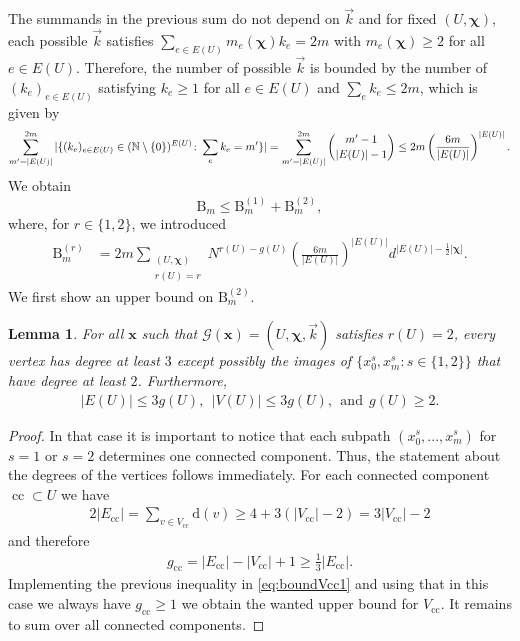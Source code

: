 \documentclass[10pt,a4paper]{amsart}
\DeclareMathOperator{\cc}{cc}
\newcommand{\abs}[1]{\left| #1 \right|}
\newcommand{\patx}{\boldsymbol{x}}
\newcommand{\patchi}{\boldsymbol{\chi}}
\newtheorem{lemma}{Lemma}[section]
\numberwithin{equation}{section}
\newcommand{\nc}{\normalcolor}
\begin{document}
	The summands in the previous sum do not depend on $\vec{k}$ and for fixed $(U,\patchi)$, each possible $\vec{k}$ satisfies $\sum_{e\in E(U)} m_{e}(\patchi) k_{e} = 2m$ with $m_e(\patchi) \ge 2$ for all $e \in E(U)$. Therefore, the number of possible $\vec{k}$ is bounded by the number of $(k_{e})_{e \in E(U)}$ satisfying $k_e \ge 1$ for all $e \in E(U)$ and $\sum_{e}k_{e} \le 2m$, which is given by
	\begin{equation*}
	     \sum^{2m}_{m^\prime= \abs{E(U)}} |\{ (k_e)_{e\in E(U)}\in (\mathbb{N}\setminus{\{0\}})^{E(U)} \colon \sum_e k_e =m^\prime\} |=\nc\sum^{2m}_{m^\prime = \abs{E(U)}} \binom{m^\prime-1}{\abs{E(U)}-1} \le 2m \left( \frac{6m}{\abs{E(U)}}\right)^{\abs{E(U)}}.
	\end{equation*}
		We obtain
	\begin{equation*}
	    	      \mathrm{B}_{m} \le \mathrm{B}_{m}^{(1)} + \mathrm{B}_{m}^{(2)}, 
	\end{equation*}
	where, for $r \in \{1, 2\}$, we introduced 
	\begin{align*}
	    	  \mathrm{B}_{m}^{(r)} &= 2m\sum_{\substack{(U,\patchi)\\ r(U)=r}}  N^{r(U)-g(U)} \left(\frac{6m}{|E(U)|}\right)^{|E(U)|}d^{|E(U)| - \frac{1}{2}|\patchi|}.
	\end{align*}
	We first show an upper bound on $\mathrm{B}_{m}^{(2)}$. 
	
	\begin{lemma}\label{lem:bounds_case_ru=r}
	    For all $\patx$ such that $\mathcal G (\patx)= (U,\patchi, \vec{k})$ satisfies $r(U)=2$, every vertex has degree at least $3$ except possibly the images of $\{x_{0}^s,x_m^{s} \colon s\in \{1,2\}\}$ that have degree at least $2$. Furthermore,  
\begin{align*}
    \abs{E(U)} \le 3g(U), ~~ \abs{V(U)} \le 3g(U),~~ \text{and} ~~ g(U)\ge 2.
\end{align*}	

\end{lemma}
\begin{proof}
In that case it is important to notice that each subpath $(x_{0}^s,...,x_{m}^s)$ for $s = 1$ or $s = 2$ determines one connected component. Thus, the statement about the degrees of the vertices follows immediately. 
For each connected component $\cc \subset U$ we have
\begin{align}\label{eq:boundVcc1}
    2|E_{\cc}| = \sum_{v \in V_{\cc}} \mathrm{d}(v) \ge 4 + 3 (|V_{\cc}| -2 ) = 3|V_{\cc}| -2
\end{align}
and therefore
\begin{align*}
    g_{\cc} = \abs{E_{\cc}} - \abs{V_{\cc}} + 1 \ge \frac{1}{3} \abs{E_{\cc}}.
\end{align*}
Implementing the previous inequality in \eqref{eq:boundVcc1} and using that in this case we always have $g_{\cc} \ge 1$ we obtain the wanted upper bound for $V_{\cc}$. It remains to sum over all connected components.
\end{proof}
\end{document}
